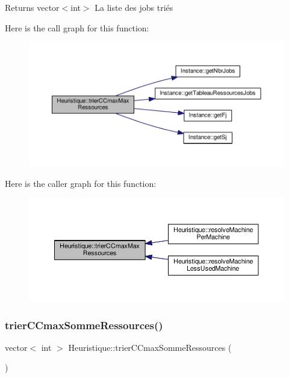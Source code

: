 \begin{DoxyReturn}{Returns}
vector$<$int$>$ La liste des jobs triés 
\end{DoxyReturn}
Here is the call graph for this function\+:\nopagebreak
\begin{figure}[H]
\begin{center}
\leavevmode
\includegraphics[width=350pt]{classHeuristique_a1fb7501d952a428b817ad179bc2a2185_cgraph}
\end{center}
\end{figure}
Here is the caller graph for this function\+:\nopagebreak
\begin{figure}[H]
\begin{center}
\leavevmode
\includegraphics[width=350pt]{classHeuristique_a1fb7501d952a428b817ad179bc2a2185_icgraph}
\end{center}
\end{figure}
\mbox{\label{classHeuristique_a19705558bc45437d88b750fe9cbe6125}} 
\subsubsection{\texorpdfstring{trier\+C\+Cmax\+Somme\+Ressources()}{trierCCmaxSommeRessources()}}
{\footnotesize\ttfamily vector$<$ int $>$ Heuristique\+::trier\+C\+Cmax\+Somme\+Ressources (\begin{DoxyParamCaption}{ }\end{DoxyParamCaption})}



